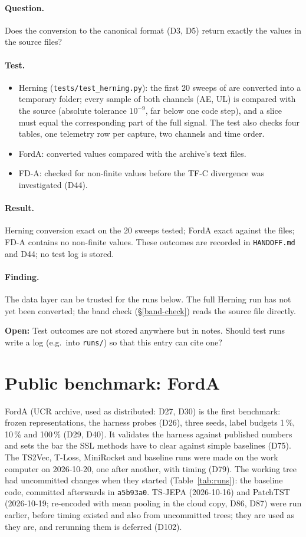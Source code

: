 \documentclass[11pt,a4paper]{article}
\newcommand{\question}{\paragraph{Question.}}
\newcommand{\test}{\paragraph{Test.}}
\newcommand{\result}{\paragraph{Result.}}
\newcommand{\finding}{\paragraph{Finding.}}
\newcommand{\openpoint}[1]{\par\textcolor{openpt}{\textbf{Open:}} #1\par}
\newcommand{\run}[1]{\texttt{\detokenize{#1}}}
\newcommand{\sref}[1]{\S\ref{#1}}
\begin{document}
\question
Does the conversion to the canonical format (D3, D5) return exactly the values in the
source files?

\test
\begin{itemize}
  \item Herning (\texttt{tests/test\_herning.py}): the first 20 sweeps of
        \run{scope_20260901_112732.h5} are converted into a temporary folder; every sample
        of both channels (AE, UL) is compared with the source (absolute tolerance
        $10^{-9}$, far below one code step), and a slice must equal the corresponding part
        of the full signal. The test also checks four tables, one telemetry row per
        capture, two channels and time order.
  \item FordA: converted values compared with the archive's text files.
  \item FD-A: checked for non-finite values before the TF-C divergence was investigated (D44).
\end{itemize}

\result
Herning conversion exact on the 20 sweeps tested; FordA exact against the files; FD-A
contains no non-finite values. These outcomes are recorded in \texttt{HANDOFF.md} and
D44; no test log is stored.

\finding
The data layer can be trusted for the runs below. The full Herning run has not yet been
converted; the band check (\sref{band-check}) reads the source file directly.

\openpoint{Test outcomes are not stored anywhere but in notes. Should test runs write a
log (e.g.\ into \texttt{runs/}) so that this entry can cite one?}

\section{Public benchmark: FordA}

FordA (UCR archive, used as distributed: D27, D30) is the first benchmark: frozen
representations, the harness probes (D26), three seeds, label budgets 1\,\%, 10\,\% and
100\,\% (D29, D40). It validates the harness against published numbers and sets the bar
the SSL methods have to clear against simple baselines (D75). The TS2Vec, T-Loss, MiniRocket
and baseline runs were made on the work computer on 2026-10-20, one after another, with timing
(D79). The working tree had uncommitted changes when they started (Table~\ref{tab:runs}): the
baseline code, committed afterwards in \texttt{a5b93a0}. TS-JEPA (2026-10-16) and PatchTST
(2026-10-19; re-encoded with mean pooling in the cloud copy, D86, D87) were run earlier, before
timing existed and also from uncommitted trees; they are used as they are, and rerunning them
is deferred (D102).
\end{document}
